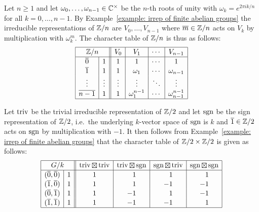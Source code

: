 \begin{example}
  Let $n \geq 1$ and let $\omega_0, \dotsc, \omega_{n-1} \in \mathbb{C}^\times$ be the $n$-th roots of unity with $\omega_k = e^{2 \pi i k / n}$ for all $k = 0, \dotsc, n-1$.
  By Example~\ref{example: irrep of finite abelian groups} the irreducible representations of $\mathbb{Z}/n$ are $V_0, \dotsc, V_{n-1}$ where $\overline{m} \in \mathbb{Z}/n$ acts on $V_k$ by multiplication with $\omega_k^m$.
  The character table of $\mathbb{Z}/n$ is thus as follows:
  \[
    \begin{array}{|c|c||c|c|c|c|}
      \hline
        \multicolumn{2}{|c||}{\Integer/n}
      & V_0
      & V_1
      & \cdots
      & V_{n-1}
      \\
      \hline
        \class{0}
      & 1
      & 1
      & 1
      & \cdots
      & 1
      \\
        \class{1}
      & 1
      & 1
      & \omega_1
      & \cdots
      & \omega_{n-1}
      \\
        \vdots
      & \vdots
      & \vdots
      & \vdots
      & \ddots
      & \vdots
      \\
        \class{n-1}
      & 1
      & 1
      & \omega_1 ^{n-1}
      & \cdots
      & \omega_{n-1}^{n-1}
      \\
      \hline
    \end{array}
  \]
\end{example}


\begin{example}
  Let $\operatorname{triv}$ be the trivial irreducible representation of $\mathbb{Z}/2$ and let $\operatorname{sgn}$ be the sign representation of $\mathbb{Z}/2$, i.e.\ the underlying $k$-vector space of $\operatorname{sgn}$ is $k$ and $\overline{1} \in \mathbb{Z}/2$ acts on $\operatorname{sgn}$ by multiplication with $-1$.
  It then follows from Example~\ref{example: irrep of finite abelian groups} that the character table of $\mathbb{Z}/2 \times \mathbb{Z}/2$ is given as follows:
  \[
    \begingroup
    \renewcommand{\arraystretch}{1.1}
    \begin{array}{|c|c||c|c|c|c|}
      \hline
        \multicolumn{2}{|c||}{G/k}
      & \triv \outertensor \triv
      & \triv \outertensor \sgn
      & \sgn \outertensor \triv
      & \sgn \outertensor \sgn
      \\
      \hline
        (\class{0},\class{0})
      & 1
      &            1
      & \phantom{-}1
      & \phantom{-}1
      & \phantom{-}1
      \\
        (\class{1},\class{0})
      & 1
      &            1
      & \phantom{-}1
      &           -1
      &           -1
      \\
        (\class{0},\class{1})
      & 1
      &            1
      &           -1
      & \phantom{-}1
      &           -1
      \\
        (\class{1},\class{1})
      & 1
      &            1
      &           -1
      &           -1
      & \phantom{-}1
      \\
      \hline
    \end{array}
    \endgroup
  \]
\end{example}


